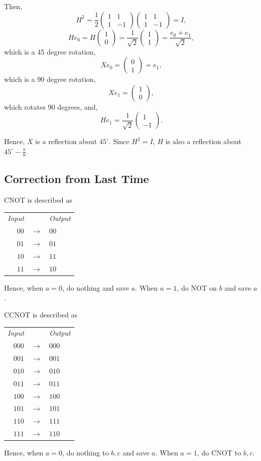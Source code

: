\documentclass[12pt]{article}
\theoremstyle{definition}
\begin{document}
Then,
\[
H^2 = \frac{1}{2}\begin{pmatrix}1&1\\1&-1\end{pmatrix}\begin{pmatrix}1&1\\1&-1\end{pmatrix} = I,
\]
\[
He_0 = H\begin{pmatrix}1\\0\end{pmatrix} = \frac{1}{\sqrt{2}}\begin{pmatrix}1\\1\end{pmatrix} = \frac{e_0+e_1}{\sqrt{2}},
\]
which is a 45 degree rotation,
\[
Xe_0 = \begin{pmatrix}0\\1\end{pmatrix} = e_1,
\]
which is a 90 degree rotation,
\[
Xe_1 = \begin{pmatrix}1\\0\end{pmatrix},
\]
which rotates 90 degrees, and,
\[
He_1 = \frac{1}{\sqrt{2}}\begin{pmatrix}1\\-1\end{pmatrix}.
\]

Hence, $X$ is a reflection about $45^\circ$. Since $H^2 = I$, $H$ is also a reflection about $45^\circ-\frac{\pi}{8}$.

\subsection{Correction from Last Time}

CNOT is described as
\begin{center}
\begin{tabular}{rcl}
\textit{Input} & & \textit{Output} \\
$00$ & $\to$ & $00$ \\
$01$ & $\to$ & $01$ \\
$10$ & $\to$ & $11$ \\
$11$ & $\to$ & $10$
\end{tabular}
\end{center}
Hence, when $a = 0$, do nothing and save $a$. When $a = 1$, do NOT on $b$ and save $a$.

CCNOT is described as
\begin{center}
\begin{tabular}{rcl}
\textit{Input} & & \textit{Output} \\
$000$ & $\to$ & $000$ \\
$001$ & $\to$ & $001$ \\
$010$ & $\to$ & $010$ \\
$011$ & $\to$ & $011$ \\
$100$ & $\to$ & $100$ \\
$101$ & $\to$ & $101$ \\
$110$ & $\to$ & $111$ \\
$111$ & $\to$ & $110$
\end{tabular}
\end{center}
Hence, when $a = 0$, do nothing to $b, c$ and save $a$. When $a = 1$, do CNOT to $b, c$.
\end{document}
